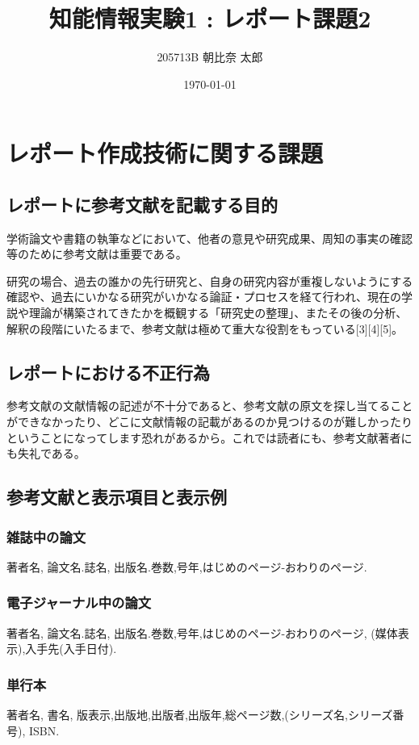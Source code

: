 \documentclass[a4paper, 11pt, titlepage]{jsarticle}
\title {知能情報実験1 : レポート課題2}
\author{205713B  朝比奈 太郎}
\date{\today }
\begin{document}
\maketitle
\tableofcontents
\clearpage

\section{レポート作成技術に関する課題}
\subsection{レポートに参考文献を記載する目的}

学術論文や書籍の執筆などにおいて、他者の意見や研究成果、周知の事実の確認等のために参考文献は重要である。

研究の場合、過去の誰かの先行研究と、自身の研究内容が重複しないようにする確認や、過去にいかなる研究がいかなる論証・プロセスを経て行われ、現在の学説や理論が構築されてきたかを概観する「研究史の整理」、またその後の分析、解釈の段階にいたるまで、参考文献は極めて重大な役割をもっている[3][4][5]。

\subsection{レポートにおける不正行為}
参考文献の文献情報の記述が不十分であると、参考文献の原文を探し当てることができなかったり、どこに文献情報の記載があるのか見つけるのが難しかったりということになってします恐れがあるから。これでは読者にも、参考文献著者にも失礼である。
\subsection{参考文献と表示項目と表示例}
\subsubsection{雑誌中の論文}
著者名, 論文名.誌名, 出版名.巻数,号年,はじめのページ-おわりのページ.
\subsubsection{電子ジャーナル中の論文}
著者名, 論文名.誌名, 出版名.巻数,号年,はじめのページ-おわりのページ, (媒体表示),入手先(入手日付).
\subsubsection{単行本}
著者名, 書名, 版表示,出版地,出版者,出版年,総ページ数,(シリーズ名,シリーズ番号), ISBN.
\end{document}
